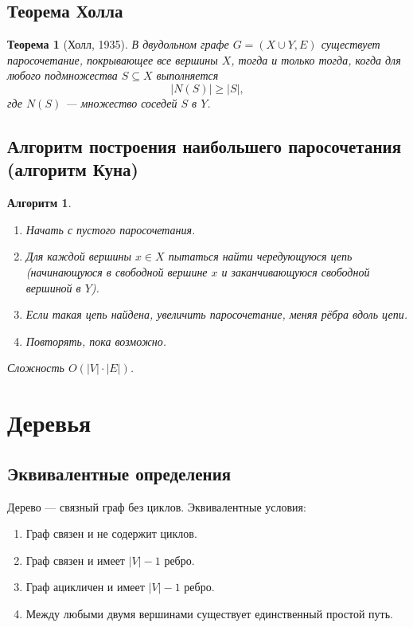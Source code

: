 \documentclass[12pt]{article}
\newtheorem{theorem}{Теорема}
\newtheorem{algorithm}{Алгоритм}
\begin{document}
\begin{enumerate}
\subsection{Теорема Холла}
\begin{theorem}[Холл, 1935]
    В двудольном графе \(G = (X \cup Y, E)\) существует паросочетание, покрывающее все вершины \(X\), тогда и только тогда, когда для любого подмножества \(S \subseteq X\) выполняется
    \[
    |N(S)| \ge |S|,
    \]
    где \(N(S)\) — множество соседей \(S\) в \(Y\).
\end{theorem}

\subsection{Алгоритм построения наибольшего паросочетания (алгоритм Куна)}
\begin{algorithm}
    \begin{enumerate}
        \item Начать с пустого паросочетания.
        \item Для каждой вершины \(x \in X\) пытаться найти \textit{чередующуюся цепь} (начинающуюся в свободной вершине \(x\) и заканчивающуюся свободной вершиной в \(Y\)).
        \item Если такая цепь найдена, увеличить паросочетание, меняя рёбра вдоль цепи.
        \item Повторять, пока возможно.
    \end{enumerate}
    Сложность \(O(|V| \cdot |E|)\).
\end{algorithm}

\section{Деревья}
\subsection{Эквивалентные определения}
Дерево — связный граф без циклов. Эквивалентные условия:
\begin{enumerate}
    \item Граф связен и не содержит циклов.
    \item Граф связен и имеет \(|V| - 1\) ребро.
    \item Граф ацикличен и имеет \(|V| - 1\) ребро.
    \item Между любыми двумя вершинами существует единственный простой путь.
\end{enumerate}


\end{enumerate}
\end{document}
